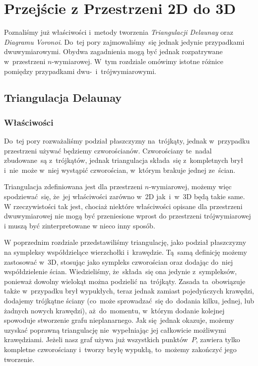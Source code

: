 \documentclass[skorowidz,autorrok,backref,xodstep,oswiadczenie]{wmimgr}
\begin{document}
\chapter{Przejście z Przestrzeni 2D do 3D}

Poznaliśmy już właściwości i~metody tworzenia \emph{Triangulacji Delaunay} oraz \emph{Diagramu Voronoi}. Do~tej pory zajmowaliśmy~się jednak jedynie przypadkami dwuwymiarowymi. Obydwa zagadnienia mogą być jednak rozpatrywane w~przestrzeni $n$-wymiarowej. W~tym rozdziale omówimy istotne różnice pomiędzy przypadkami dwu-~i~trójwymiarowymi.

\section{Triangulacja Delaunay}

\subsection{Właściwości}

Do~tej pory rozważaliśmy podział płaszczyzny na~trójkąty, jednak w~przypadku przestrzeni używać będziemy czworościanów. Czworościany te~nadal zbudowane~są z~trójkątów, jednak triangulacja składa~się z~kompletnych brył i~nie~może w~niej wystąpić czworościan, w~którym brakuje jednej ze~ścian.

Triangulacja zdefiniowana jest dla przestrzeni $n$-wymiarowej, możemy więc spodziewać~się, że~jej właściwości zarówno w~2D jak~i~w~3D będą takie same. W rzeczywistości tak jest, chociaż niektóre właściwości opisane dla przestrzeni dwuwymiarowej nie mogą być przeniesione wprost do przestrzeni trójwymiarowej i muszą być zinterpretowane w nieco inny sposób.

W poprzednim rozdziale przedstawiliśmy triangulację, jako podział płaszczyzny na sympleksy współdzielące wierzchołki i~krawędzie. Tą~samą definicję możemy zastosować w~3D, stosując jako sympleks czworościan oraz dodając do~niej współdzielenie ścian. Wiedzieliśmy, że~składa~się ona jedynie z~sympleksów, ponieważ dowolny wielokąt można podzielić na~trójkąty. Zasada ta~obowiązuje także w~przypadku brył wypukłych, teraz jednak zamiast pojedyńczych krawędzi, dodajemy trójkątne ściany (co~może sprowadzać~się do~dodania kilku, jednej, lub żadnych nowych krawędzi), aż~do~momentu, w~którym dodanie kolejnej spowoduje stworzenie grafu nieplanarnego. Jak się~jednak okazuje, możemy uzyskać poprawną triangulację nie~wypełniając jej całkowicie możliwymi krawędziami. Jeżeli nasz graf używa już wszystkich punktów~$P$, zawiera tylko kompletne czworościany i~tworzy bryłę wypukłą, to~możemy zakończyć jego tworzenie.
\end{document}

